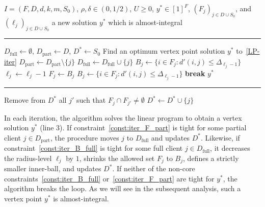 \begin{algorithm}[h]
\caption{Iterative Rounding Algorithm} \label{alg:iterative_rounding}
\begin{algorithmic}
    \Require $I = (F, D, d, k, m, S_0)$, $\rho, \delta \in (0, 1/2)$, $U \ge 0$, $y^* \in [1]^F$, $(F_j)_{j \in D \cup S_0}$, and $(\ell_j)_{j \in D \cup S_0}$
    \Ensure a new solution $y^*$ which is almost-integral
\end{algorithmic}
\noindent\rule{\linewidth}{0.4pt}

\begin{algorithmic}[1]
    \State $D_\text{full} \gets \emptyset$, $D_\text{part} \gets D$, $D^* \gets S_0$
        \State Find an optimum vertex point solution $y^*$ to~\eqref{LP-iter}
            \State $D_\text{part} \gets D_\text{part} \setminus \{j\}$
            \State $D_\text{full} \gets D_\text{full} \cup \{j\}$
            \State $B_j \gets \{i \in F_j : d'(i,j) \le \Delta_{\ell_j-1}\}$
            \State {}
            \State $\ell_j \gets \ell_j - 1$
            \State $F_j \gets B_j$
            \State $B_j \gets \{i \in F_j : d'(i,j) \le \Delta_{\ell_j-1}\}$
            \State {}
        \Else
            \State \textbf{break}
        \EndIf
    \EndWhile
    \State \Return $y^*$
\end{algorithmic}
\noindent\rule{\linewidth}{0.4pt}

\begin{algorithmic}[1]
            \State Remove from $D^*$ all $j'$ such that $F_j \cap F_{j'} \neq \emptyset$
            \State $D^* \gets D^* \cup \{j\}$
        \EndIf
    \EndFunction
\end{algorithmic}
\end{algorithm}


In each iteration, the algorithm solves the linear program to obtain a vertex solution $y^*$ (line 3). If constraint~\eqref{const:iter_F_part} is tight for some partial client $j \in D_\text{part}$, the procedure moves $j$ to $D_\text{full}$ and updates $D^*$. Likewise, if constraint~\eqref{const:iter_B_full} is tight for some full client $j \in D_\text{full}$, it decreases the radius-level $\ell_j$ by $1$, shrinks the allowed set $F_j$ to $B_j$, defines a strictly smaller inner-ball, and updates $D^*$. If neither of the non-core constraints~\eqref{const:iter_B_full} or~\eqref{const:iter_F_part} are tight for $y^*$, the algorithm breaks the loop. As we will see in the subsequent analysis, such a vertex point $y^*$ is almost-integral.

